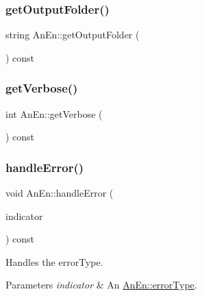 \mbox{\label{class_an_en_a017dc9da4386e61d8cc4d8f5f026628c}} 
\subsubsection{\texorpdfstring{get\+Output\+Folder()}{getOutputFolder()}}
{\footnotesize\ttfamily string An\+En\+::get\+Output\+Folder (\begin{DoxyParamCaption}{ }\end{DoxyParamCaption}) const}

\mbox{\label{class_an_en_aa937a792202a83e88df6e019a991b848}} 
\subsubsection{\texorpdfstring{get\+Verbose()}{getVerbose()}}
{\footnotesize\ttfamily int An\+En\+::get\+Verbose (\begin{DoxyParamCaption}{ }\end{DoxyParamCaption}) const}

\mbox{\label{class_an_en_a2c33c46f4bed8132aa2f6305fa702c0d}} 
\subsubsection{\texorpdfstring{handle\+Error()}{handleError()}}
{\footnotesize\ttfamily void An\+En\+::handle\+Error (\begin{DoxyParamCaption}\item[{const \mbox{\hyperlink{class_an_en_a0e256eb89d102d318a47d936b02242bf}{error\+Type}} \&}]{indicator }\end{DoxyParamCaption}) const}

Handles the error\+Type.


\begin{DoxyParams}{Parameters}
{\em indicator} & An \mbox{\hyperlink{class_an_en_a0e256eb89d102d318a47d936b02242bf}{An\+En\+::error\+Type}}. \\
\hline
\end{DoxyParams}
\mbox{\label{class_an_en_adc4ff05a5f03529fbd95f0547606f83e}} 
